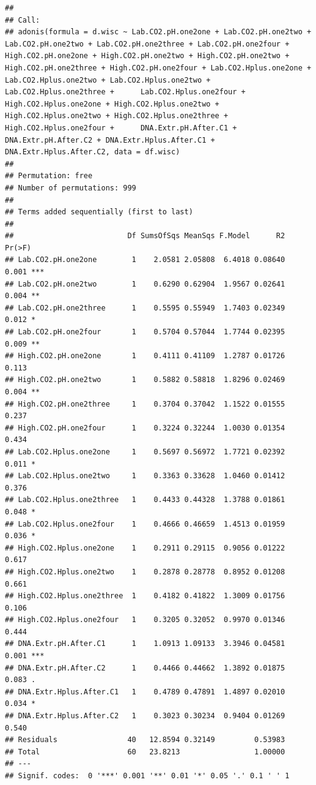 \documentclass[]{article}
\begin{document}
\begin{verbatim}
## 
## Call:
## adonis(formula = d.wisc ~ Lab.CO2.pH.one2one + Lab.CO2.pH.one2two +      Lab.CO2.pH.one2two + Lab.CO2.pH.one2three + Lab.CO2.pH.one2four +      High.CO2.pH.one2one + High.CO2.pH.one2two + High.CO2.pH.one2two +      High.CO2.pH.one2three + High.CO2.pH.one2four + Lab.CO2.Hplus.one2one +      Lab.CO2.Hplus.one2two + Lab.CO2.Hplus.one2two + Lab.CO2.Hplus.one2three +      Lab.CO2.Hplus.one2four + High.CO2.Hplus.one2one + High.CO2.Hplus.one2two +      High.CO2.Hplus.one2two + High.CO2.Hplus.one2three + High.CO2.Hplus.one2four +      DNA.Extr.pH.After.C1 + DNA.Extr.pH.After.C2 + DNA.Extr.Hplus.After.C1 +      DNA.Extr.Hplus.After.C2, data = df.wisc) 
## 
## Permutation: free
## Number of permutations: 999
## 
## Terms added sequentially (first to last)
## 
##                          Df SumsOfSqs MeanSqs F.Model      R2 Pr(>F)    
## Lab.CO2.pH.one2one        1    2.0581 2.05808  6.4018 0.08640  0.001 ***
## Lab.CO2.pH.one2two        1    0.6290 0.62904  1.9567 0.02641  0.004 ** 
## Lab.CO2.pH.one2three      1    0.5595 0.55949  1.7403 0.02349  0.012 *  
## Lab.CO2.pH.one2four       1    0.5704 0.57044  1.7744 0.02395  0.009 ** 
## High.CO2.pH.one2one       1    0.4111 0.41109  1.2787 0.01726  0.113    
## High.CO2.pH.one2two       1    0.5882 0.58818  1.8296 0.02469  0.004 ** 
## High.CO2.pH.one2three     1    0.3704 0.37042  1.1522 0.01555  0.237    
## High.CO2.pH.one2four      1    0.3224 0.32244  1.0030 0.01354  0.434    
## Lab.CO2.Hplus.one2one     1    0.5697 0.56972  1.7721 0.02392  0.011 *  
## Lab.CO2.Hplus.one2two     1    0.3363 0.33628  1.0460 0.01412  0.376    
## Lab.CO2.Hplus.one2three   1    0.4433 0.44328  1.3788 0.01861  0.048 *  
## Lab.CO2.Hplus.one2four    1    0.4666 0.46659  1.4513 0.01959  0.036 *  
## High.CO2.Hplus.one2one    1    0.2911 0.29115  0.9056 0.01222  0.617    
## High.CO2.Hplus.one2two    1    0.2878 0.28778  0.8952 0.01208  0.661    
## High.CO2.Hplus.one2three  1    0.4182 0.41822  1.3009 0.01756  0.106    
## High.CO2.Hplus.one2four   1    0.3205 0.32052  0.9970 0.01346  0.444    
## DNA.Extr.pH.After.C1      1    1.0913 1.09133  3.3946 0.04581  0.001 ***
## DNA.Extr.pH.After.C2      1    0.4466 0.44662  1.3892 0.01875  0.083 .  
## DNA.Extr.Hplus.After.C1   1    0.4789 0.47891  1.4897 0.02010  0.034 *  
## DNA.Extr.Hplus.After.C2   1    0.3023 0.30234  0.9404 0.01269  0.540    
## Residuals                40   12.8594 0.32149         0.53983           
## Total                    60   23.8213                 1.00000           
## ---
## Signif. codes:  0 '***' 0.001 '**' 0.01 '*' 0.05 '.' 0.1 ' ' 1
\end{verbatim}
\end{document}
